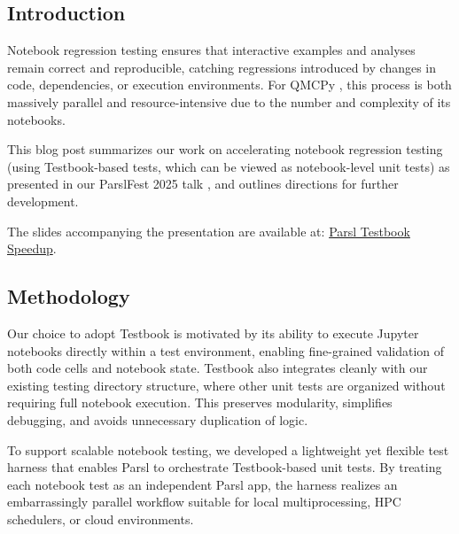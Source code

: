 \subsection{Introduction}

Notebook regression testing  ensures that interactive examples and analyses
remain correct and reproducible, catching regressions introduced by changes in
code, dependencies, or execution environments. For QMCPy \cite{QMCPy2020a}, this
process is both massively parallel and resource-intensive due to the number and
complexity of its notebooks.

This blog post summarizes our work on accelerating notebook regression testing
(using Testbook-based tests, which can be viewed as notebook-level unit tests)
as presented in our ParslFest 2025 talk \cite{parslfest2025}, and outlines
directions for further development.

The slides accompanying the presentation are available at:
\href{https://github.com/QMCSoftware/QMCSoftware/raw/refs/heads/parsl_presentation/demos/talk_paper_demos/Parslfest_2025/Parsl%20Testbook%20Speedup.pptx}{Parsl Testbook Speedup}.

\subsection{Methodology}

Our choice to adopt Testbook \cite{testbook2021} is motivated by its ability to
execute Jupyter notebooks directly within a test environment, enabling
fine-grained validation of both code cells and notebook state. Testbook also
integrates cleanly with our existing testing directory structure, where other
unit tests are organized without requiring full notebook execution. This
preserves modularity, simplifies debugging, and avoids unnecessary duplication
of logic.

To support scalable notebook testing, we developed a lightweight yet flexible
test harness that enables Parsl \cite{parsl2019} to orchestrate Testbook-based
unit tests. By treating each notebook test as an independent Parsl app, the
harness realizes an embarrassingly parallel workflow suitable for local
multiprocessing, HPC schedulers, or cloud environments.

